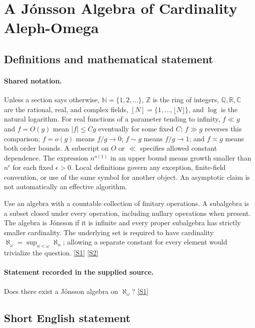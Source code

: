 \documentclass[11pt,a4paper]{article}
\newcommand{\N}{\mathbb{N}}
\newcommand{\Z}{\mathbb{Z}}
\newcommand{\Q}{\mathbb{Q}}
\newcommand{\R}{\mathbb{R}}
\newcommand{\C}{\mathbb{C}}
\newcommand{\sref}[2]{\hyperlink{source:#1:#2}{[S#2]}}
\begin{document}
\section{A Jónsson Algebra of Cardinality Aleph-Omega}\label{statement}


\subsection{Definitions and mathematical statement}

\paragraph{Shared notation.}Unless a section says otherwise, $\N=\{1,2,\ldots\}$,
$\Z$ is the ring of integers, $\Q,\R,\C$ are the rational, real, and complex
fields, $[N]=\{1,\ldots,\lfloor N\rfloor\}$, and $\log$ is the natural
logarithm. For real functions of a parameter tending to infinity,
$f\ll g$ and $f=O(g)$ mean $|f|\leq Cg$ eventually for some fixed $C$;
$f\gg g$ reverses this comparison; $f=o(g)$ means $f/g\to0$;
$f\sim g$ means $f/g\to1$; and $f\asymp g$ means both order bounds.
A subscript on $O$ or $\ll$ specifies allowed constant dependence.
The expression $n^{o(1)}$ in an upper bound means growth smaller than
$n^\epsilon$ for each fixed $\epsilon>0$. Local definitions govern any
exception, finite-field convention, or use of the same symbol for another
object. An asymptotic claim is not automatically an effective algorithm.



Use an algebra with a countable collection of finitary operations. A subalgebra is a subset closed under every operation, including nullary operations when present. The algebra is Jónsson if it is infinite and every proper subalgebra has strictly smaller cardinality. The underlying set is required to have cardinality $\aleph_\omega=\sup_{n<\omega}\aleph_n$; allowing a separate constant for every element would trivialize the question. \sref{statement}{1} \sref{statement}{2}

\paragraph{Statement recorded in the supplied source.}
Does there exist a Jónsson algebra on $\aleph_\omega$? \sref{statement}{1}

\subsection{Short English statement}
\end{document}
